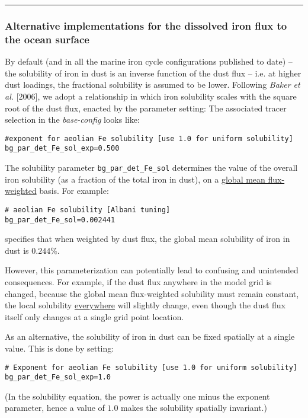 \documentclass[11pt,fleqn]{book} %
\begin{document}
%
\noindent\rule{4cm}{0.5pt}
\subsubsection{Alternative implementations for the dissolved iron flux to the ocean surface}
\vspace{2mm}

By default (and in all the marine iron cycle configurations published to date) -- the solubility of iron in dust is an inverse function of the dust flux -- i.e. at higher dust loadings, the fractional solubility is assumed to be lower. Following \textit{Baker et al.} [2006], we adopt a relationship in which iron solubility scales with the square root of the dust flux, enacted by the parameter setting:
The associated tracer selection in the \textit{base-config} looks like:
\small\vspace{-2pt}\begin{verbatim}
#exponent for aeolian Fe solubility [use 1.0 for uniform solubility]
bg_par_det_Fe_sol_exp=0.500
\end{verbatim}\vspace{-2pt}\normalsize
The solubility parameter \texttt{\small bg\_par\_det\_Fe\_sol} determines the value of the overall iron solubility (as a fraction of the total iron in dust), on a \uline{global mean flux-weighted} basis. For example:
\small\vspace{-2pt}\begin{verbatim}
# aeolian Fe solubility [Albani tuning]
bg_par_det_Fe_sol=0.002441
\end{verbatim}\vspace{-2pt}\normalsize
specifies that when weighted by dust flux, the global mean solubility of iron in dust is \(0.244\%\).

However, this parameterization can potentially lead to confusing and unintended consequences. For example, if the dust flux anywhere in the model grid is changed, because the global mean flux-weighted solubility must remain constant, the local solubility \uline{everywhere} will slightly change, even though the dust flux itself only changes at a single grid point location.

\vspace{2mm}
As an alternative, the solubility of iron in dust can be fixed spatially at a single value. This is done  by setting:
\small\vspace{-2pt}\begin{verbatim}
# Exponent for aeolian Fe solubility [use 1.0 for uniform solubility]
bg_par_det_Fe_sol_exp=1.0
\end{verbatim}\vspace{-2pt}\normalsize
(In the solubility equation, the power is actually one minus the exponent parameter, hence a value of \(1.0\) makes the solubility spatially invariant.)
\end{document}
